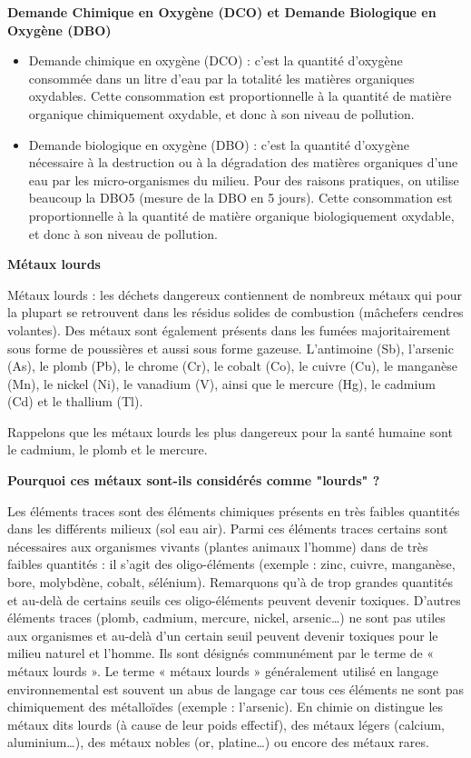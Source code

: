 \textbf{Demande Chimique en Oxygène (DCO) et Demande Biologique en Oxygène (DBO)}

\begin{itemize}
 \item Demande chimique en oxygène (DCO) : c’est la quantité d’oxygène consommée dans un litre d’eau par la totalité les matières organiques oxydables. Cette consommation est proportionnelle à la quantité de matière organique chimiquement oxydable, et donc à son niveau de pollution.
 \item Demande biologique en oxygène (DBO) : c’est la quantité d’oxygène nécessaire à la destruction ou à la dégradation des matières organiques d’une eau par les micro-organismes du milieu. Pour des raisons pratiques, on utilise beaucoup la DBO5 (mesure de la DBO en 5 jours). Cette consommation est proportionnelle à la quantité de matière organique biologiquement oxydable, et donc à son niveau de pollution.
\end{itemize}

\newpage
\textbf{Métaux lourds}
\vspace{0.3cm}

Métaux lourds : les déchets dangereux contiennent de nombreux métaux qui pour la plupart se retrouvent dans les résidus solides de combustion (mâchefers cendres volantes). Des métaux sont également présents dans les fumées majoritairement sous forme de poussières et aussi sous forme gazeuse.
L’antimoine (Sb), l’arsenic (As), le plomb (Pb), le chrome (Cr), le cobalt (Co), le cuivre (Cu), le manganèse (Mn), le nickel (Ni), le vanadium (V), ainsi que le mercure (Hg), le cadmium (Cd) et le thallium (Tl).

\vspace{0.3cm}

Rappelons que les métaux lourds les plus dangereux pour la santé humaine sont le cadmium, le plomb et le mercure.

\vspace{0.3cm}

\textbf{Pourquoi ces métaux sont-ils considérés comme "lourds" ?} 
\vspace{0.3cm} 

Les éléments traces sont des éléments chimiques présents en très faibles quantités dans les différents milieux (sol eau air). 
Parmi ces éléments traces certains sont nécessaires aux organismes vivants (plantes animaux l’homme) dans de très faibles quantités : il s’agit des oligo-éléments (exemple : zinc, cuivre, manganèse, bore, molybdène, cobalt, sélénium). Remarquons qu’à de trop grandes quantités et au-delà de certains seuils ces oligo-éléments peuvent devenir toxiques.
D’autres éléments traces (plomb, cadmium, mercure, nickel, arsenic…) ne sont pas utiles aux organismes et au-delà d’un certain seuil peuvent devenir toxiques pour le milieu naturel et l’homme. Ils sont désignés communément par le terme de « métaux lourds ». Le terme « métaux lourds » généralement utilisé en langage environnemental est souvent un abus de langage car tous ces éléments ne sont pas chimiquement des métalloïdes (exemple : l’arsenic). 
En chimie on distingue les métaux dits lourds (à cause de leur poids effectif), des métaux légers (calcium, aluminium…), des métaux nobles (or, platine…) ou encore des métaux rares.


